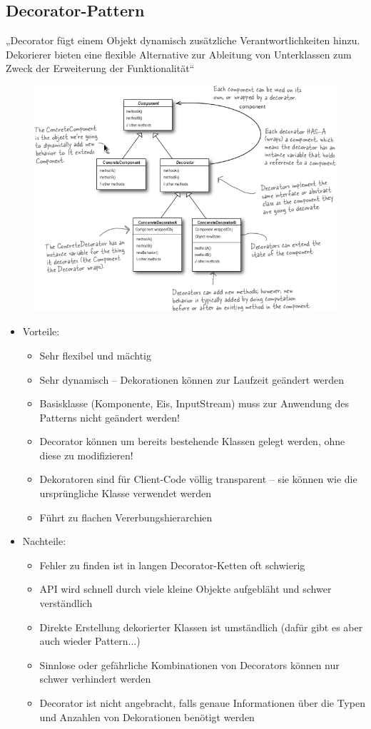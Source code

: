 \subsection{Decorator-Pattern}
„Decorator fügt einem Objekt dynamisch zusätzliche Verantwortlichkeiten hinzu. Dekorierer bieten eine flexible Alternative zur Ableitung von Unterklassen zum Zweck der Erweiterung der Funktionalität“
\begin{figure}[H]
\includegraphics[width = 15cm]{mainmatter/pics/decorator.png}
\end{figure}
\begin{itemize}
	\item Vorteile:
	\begin{itemize}
\item Sehr flexibel und mächtig
\item Sehr dynamisch – Dekorationen können zur Laufzeit geändert werden
\item Basisklasse (Komponente, Eis, InputStream) muss zur Anwendung des Patterns nicht geändert werden!
\item Decorator können um bereits bestehende Klassen gelegt werden, ohne diese zu modifizieren!
\item Dekoratoren sind für Client-Code völlig transparent – sie können wie die ursprüngliche Klasse verwendet werden
\item Führt zu flachen Vererbungshierarchien
	\end{itemize}
	\item Nachteile:
	\begin{itemize}
\item Fehler zu finden ist in langen Decorator-Ketten oft schwierig
\item API wird schnell durch viele kleine Objekte aufgebläht und schwer verständlich
\item Direkte Erstellung dekorierter Klassen ist umständlich (dafür gibt es aber auch wieder Pattern...)
\item  Sinnlose oder gefährliche Kombinationen von Decorators können nur schwer verhindert werden
\item Decorator ist nicht angebracht, falls genaue Informationen über die Typen und Anzahlen von Dekorationen benötigt werden
	\end{itemize}
\end{itemize}
%
%
%
